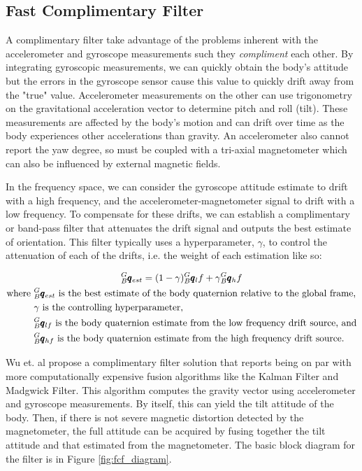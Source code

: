 \subsection{Fast Complimentary Filter} 
A complimentary filter take advantage of the problems inherent with the accelerometer and gyroscope measurements such they \textit{compliment} each other.
By integrating gyroscopic measurements, we can quickly obtain the body's attitude but the errors in the gyroscope sensor cause this value to quickly drift away from the "true" value.
Accelerometer measurements on the other can use trigonometry on the gravitational acceleration vector to determine pitch and roll (tilt).
These measurements are affected by the body's motion and can drift over time as the body experiences other accelerations than gravity.
An accelerometer also cannot report the yaw degree, so must be coupled with a tri-axial magnetometer which can also be influenced by external magnetic fields.

In the frequency space, we can consider the gyroscope attitude estimate to drift with a high frequency, and the accelerometer-magnetometer signal to drift with a low frequency.
To compensate for these drifts, we can establish a complimentary or band-pass filter that attenuates the drift signal and outputs the best estimate of orientation.
This filter typically uses a hyperparameter, $\gamma$, to control the attenuation of each of the drifts, i.e. the weight of each estimation like so:

\begin{gather} \labeq{fcf}
    {}^G_B\pmb{q}_{est} = (1-\gamma){}^G_B\pmb{q}_lf + \gamma {}^G_B\pmb{q}_hf \\
    \begin{aligned}
        \text{where } &{}^G_B\pmb{q}_{est} \text{ is the best estimate of the body quaternion relative to the global frame,} \\
                      &\gamma \text{ is the controlling hyperparameter, } \\
                      &{}^G_B\pmb{q}_{lf} \text{ is the body quaternion estimate from the low frequency drift source, and} \\
                      &{}^G_B\pmb{q}_{hf} \text{ is the body quaternion estimate from the high frequency drift source.}
    \end{aligned} \notag
\end{gather}

Wu et. al \cite{FCF:2016} propose a complimentary filter solution that reports being on par with more computationally expensive fusion algorithms like the Kalman Filter and Madgwick Filter.
This algorithm computes the gravity vector using accelerometer and gyroscope measurements.
By itself, this can yield the tilt attitude of the body.
Then, if there is not severe magnetic distortion detected by the magnetometer, the full attitude can be acquired by fusing together the tilt attitude and that estimated from the magnetometer.
The basic block diagram for the filter is in Figure \ref{fig:fcf_diagram}.

